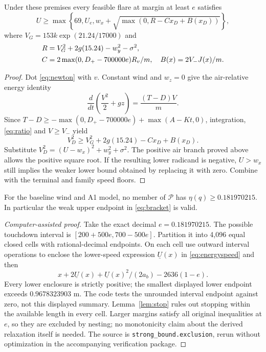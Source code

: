 \begin{proposition}\label{prop:energy}
Under these premises every feasible flare at margin at least $e$ satisfies
\begin{equation}\label{eq:energyspeed}
 U\geq\max\left\{69,U_e,w_x+\sqrt{\max(0,R-Cx_D+B(x_D))}\right\},
\end{equation}
where $V_G=153k\exp(21.24/17000)$ and
\begin{align}\label{eq:RCB}
 R&=V_G^2+2g(15.24)-w_y^2-\sigma^2,\notag\\
 C&=2\max(0,D_+-700000e)R_v/m,\quad B(x)=2V_-J(x)/m.
\end{align}
\end{proposition}
\begin{proof}
Dot \eqref{eq:newton} with $v$. Constant wind and $w_z=0$ give the air-relative energy identity
\begin{equation}\label{eq:energy}
 \frac{d}{dt}\left(\frac{V^2}{2}+gz\right)=\frac{(T-D)V}{m}.
\end{equation}
Since $T-D\geq-\max(0,D_+-700000e)+\max(A-Kt,0)$, integration, \eqref{eq:ratio} and $V\geq V_-$ yield
\[
 V_D^2\geq V_G^2+2g(15.24)-Cx_D+B(x_D).
\]
Substitute $V_D^2=(U-w_x)^2+w_y^2+\sigma^2$. The positive air branch proved above allows the positive square root. If the resulting lower radicand is negative, $U>w_x$ still implies the weaker lower bound obtained by replacing it with zero. Combine with the terminal and family speed floors.
\end{proof}

\begin{proposition}\label{prop:global}
For the baseline wind and A1 model, no member of $\mathcal P$ has $\eta(q)\geq0.181970215$. In particular the weak upper endpoint in \eqref{eq:bracket} is valid.
\end{proposition}
\begin{proof}[Computer-assisted proof]
Take the exact decimal $e=0.181970215$. The possible touchdown interval is $[200+500e,700-500e]$. Partition it into 4,096 equal closed cells with rational-decimal endpoints. On each cell use outward interval operations to enclose the lower-speed expression $\underline U(x)$ in \eqref{eq:energyspeed} and then
\[
 x+2\underline U(x)+\underline U(x)^2/(2a_b)-2636(1-e).
\]
Every lower enclosure is strictly positive; the smallest displayed lower endpoint exceeds $0.9678323903$ m. The code tests the unrounded interval endpoint against zero, not this displayed summary. Lemma~\ref{lem:stop} rules out stopping within the available length in every cell. Larger margins satisfy all original inequalities at $e$, so they are excluded by nesting; no monotonicity claim about the derived relaxation itself is needed. The source is \texttt{strong\_bound.exclusion}, rerun without optimization in the accompanying verification package.
\end{proof}

